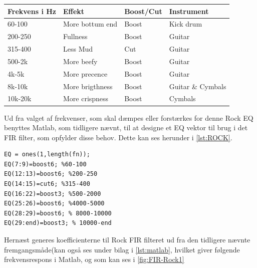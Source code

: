 \begin{center}
\begin{tabular}{| l | l | l | l |}
\hline
 Frekvens i Hz  & Effekt  & Boost/Cut & Instrument  \\\hline
 60-100 & More bottum end & Boost & Kick drum \\ \hline
 200-250 & Fullness & Boost & Guitar\\ \hline
 315-400 & Less Mud & Cut & Guitar \\ \hline
 500-2k & More beefy & Boost & Guitar\\ \hline
 4k-5k & More precence & Boost & Guitar\\ \hline
 8k-10k & More brigthness & Boost & Guitar \& Cymbals\\ \hline
 10k-20k & More crispness & Boost & Cymbals\\ \hline
 
 
\end{tabular}

\end{center}


Ud fra valget af frekvenser, som skal dæmpes eller forstærkes for denne Rock EQ benyttes Matlab, som tidligere nævnt, til at designe et EQ vektor til brug i det FIR filter, som opfylder disse behov. Dette kan ses herunder i  \autoref{lst:ROCK}.   

\begin{lstlisting}[frame=single, caption={FIR EQ vektor Rock kode},label={lst:ROCK},captionpos=b]
%% Rock
EQ = ones(1,length(fn));
EQ(7:9)=boost6; %60-100 
EQ(12:13)=boost6; %200-250 
EQ(14:15)=cut6; %315-400 
EQ(16:22)=boost3; %500-2000
EQ(25:26)=boost6; %4000-5000
EQ(28:29)=boost6; % 8000-10000
EQ(29:end)=boost3; % 10000-end
\end{lstlisting} 
Hernæst generes koefficienterne til Rock FIR filteret ud fra den tidligere nævnte fremgangsmåde(kan også ses under bilag i \autoref{lst:matlab}, hvilket giver følgende frekvensrespons i Matlab, og som kan ses i  \autoref{fig:FIR-Rock1}

